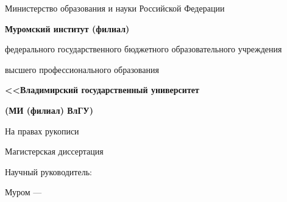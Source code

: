 \thispagestyle{empty}


\begin{center}
\baselineskip=12pt
{\normalsize Министерство образования и науки Российской Федерации}

\textbf{Муромский институт (филиал)}

{\small федерального государственного бюджетного образовательного учреждения}

{\small высшего профессионального образования}

\textbf{<<Владимирский государственный университет}

\textbf{}

{\normalsize \textbf{(МИ (филиал) ВлГУ)}}
\end{center}

\vspace{\fill}

\begin{flushright}
На правах рукописи
\end{flushright}

\bigskip

\begin{center}
\textbf{\Author}

\vspace{\fill}

\textbf{\MakeUppercase{\thetitle}}
\end{center}

\vspace{\fill}

\begin{center}
\end{center}

\vspace{\fill}

\begin{center}
Магистерская диссертация
\end{center}

\vspace{\fill}

\begin{flushright}
Научный руководитель:

\ProfessorDegree

\Professor
\end{flushright}


\vspace{\fill}

\begin{center}
Муром --- \the\year
\end{center}